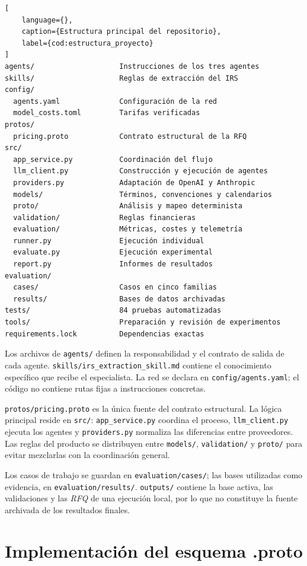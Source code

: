 \begin{lstlisting}[
    language={},
    caption={Estructura principal del repositorio},
    label={cod:estructura_proyecto}
]
agents/                    Instrucciones de los tres agentes
skills/                    Reglas de extracción del IRS
config/
  agents.yaml              Configuración de la red
  model_costs.toml         Tarifas verificadas
protos/
  pricing.proto            Contrato estructural de la RFQ
src/
  app_service.py           Coordinación del flujo
  llm_client.py            Construcción y ejecución de agentes
  providers.py             Adaptación de OpenAI y Anthropic
  models/                  Términos, convenciones y calendarios
  proto/                   Análisis y mapeo determinista
  validation/              Reglas financieras
  evaluation/              Métricas, costes y telemetría
  runner.py                Ejecución individual
  evaluate.py              Ejecución experimental
  report.py                Informes de resultados
evaluation/
  cases/                   Casos en cinco familias
  results/                 Bases de datos archivadas
tests/                     84 pruebas automatizadas
tools/                     Preparación y revisión de experimentos
requirements.lock          Dependencias exactas
\end{lstlisting}

Los archivos de \texttt{agents/} definen la responsabilidad y el contrato de salida de cada agente. \texttt{skills/irs\_extraction\_skill.md} contiene el conocimiento específico que recibe el especialista. La red se declara en \texttt{config/agents.yaml}; el código no contiene rutas fijas a instrucciones concretas.

\texttt{protos/pricing.proto} es la única fuente del contrato estructural. La lógica principal reside en \texttt{src/}: \texttt{app\_service.py} coordina el proceso, \texttt{llm\_client.py} ejecuta los agentes y \texttt{providers.py} normaliza las diferencias entre proveedores. Las reglas del producto se distribuyen entre \texttt{models/}, \texttt{validation/} y \texttt{proto/} para evitar mezclarlas con la coordinación general.

Los casos de trabajo se guardan en \texttt{evaluation/cases/}; las bases utilizadas como evidencia, en \texttt{evaluation/results/}. \texttt{outputs/} contiene la base activa, las validaciones y las \textit{RFQ} de una ejecución local, por lo que no constituye la fuente archivada de los resultados finales.

\section{Implementación del esquema .proto}
\label{sec:implementacion_proto}

